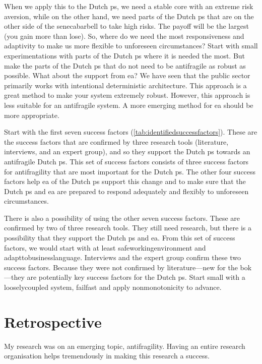 When we apply this to the Dutch \gls{ps}, we need a stable core with an extreme risk aversion, while on the other hand, we need parts of the Dutch \gls{ps} that are on the other side of the \gls{senecabarbell} to take high risks. The payoff will be the largest (you gain more than lose). So, where do we need the most responsiveness and adaptivity to make us more flexible to unforeseen circumstances? Start with small experimentations with parts of the Dutch \gls{ps} where it is needed the most. But make the parts of the Dutch \gls{ps} that do not need to be \gls{antifragile} as \gls{robust} as possible. What about the support from \gls{ea}? We have seen that the public sector primarily works with intentional deterministic architecture. This approach is a great method to make your system extremely robust. However, this approach is less suitable for an \gls{antifragile} system. A more emerging method for \gls{ea} should be more appropriate.

Start with the first seven success factors (\cref{tab:identifiedsuccessfactors}). These are the success factors that are confirmed by three research tools (literature, interviews, and an expert group), and so they support the Dutch \gls{ps} towards an \gls{antifragile} Dutch \gls{ps}. This set of success factors consists of three success factors for \gls{antifragility} that are most important for the Dutch \gls{ps}. The other four success factors help \gls{ea} of the Dutch \gls{ps} support this change and to make sure that the Dutch \gls{ps} and \gls{ea} are prepared to respond adequately and flexibly to unforeseen circumstances.

There is also a possibility of using the other seven success factors. These are confirmed by two of three research tools. They still need research, but there is a possibility that they support the Dutch \gls{ps} and \gls{ea}. From this set of success factors, we would start with at least \gls{safeworkingenvironment} and \gls{adapttobusinesslanguage}. Interviews and the expert group confirm these two success factors. Because they were not confirmed by literature---new for the \acrlong{bok}---they are potentially key success factors for the Dutch \gls{ps}. Start small with a \gls{looselycoupled} system, \gls{failfast} and apply \gls{nonmonotonicity} to advance. 

\section{Retrospective}
\label{sec:retrospective}
My research was on an emerging topic, \gls{antifragility}. Having an entire research organisation helps tremendously in making this research a success. 

